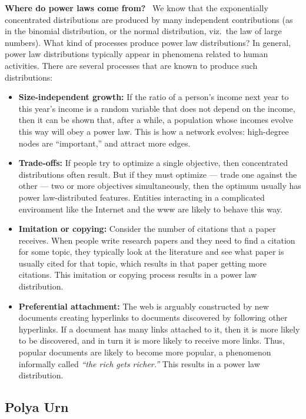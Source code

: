 \documentclass[11pt]{article}
\begin{document}
\medskip
{\bf Where do power laws come from?}~
We know that the exponentially concentrated distributions are produced by many independent contributions (as in the binomial distribution, or the normal distribution, viz.~the law of large numbers). What kind of processes produce power law distributions? In general, power law distributions typically appear in phenomena related to human activities. There are several processes that are known to produce such distributions:
\begin{itemize}
  \item {\bf Size-independent growth:} If the ratio of a person's income next year to this year's income is a random variable that does not depend on the income, then it can be shown that, after a while, a population whose incomes evolve this way will obey a power law. This is how a network evolves: high-degree nodes are ``important,'' and attract more edges.
  
  \item {\bf Trade-offs:} If people try to optimize a single objective, then concentrated distributions often result. But if they must optimize --- trade one against the other --- two or more objectives simultaneously, then the optimum usually has power law-distributed features. Entities interacting in a complicated environment like the Internet and the www are likely to behave this way.
  
  \item {\bf Imitation or copying:} Consider the number of citations that a paper receives. When people write research papers and they need to find a citation for some topic, they typically look at the literature and see what paper is usually cited for that topic, which results in that paper getting more citations. This imitation or copying process results in a power law distribution.
  
  \item {\bf Preferential attachment:} The web is arguably constructed by new documents creating hyperlinks to documents discovered by following other hyperlinks. If a document has many links attached to it, then it is more likely to be discovered, and in turn it is more likely to receive more links. Thus, popular documents are likely to become more popular, a phenomenon informally called {\em ``the rich gets richer.''} This results in a power law distribution.
\end{itemize}


\subsection*{Polya Urn}
\end{document}
